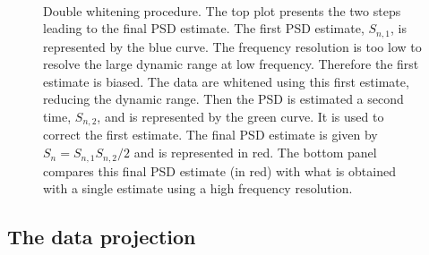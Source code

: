 \begin{figure}
  \center
   \\
  \caption{Double whitening procedure. The top plot presents the two steps leading to the final PSD estimate. The first PSD estimate, $S_{n,1}$, is represented by the blue curve. The frequency resolution is too low to resolve the large dynamic range at low frequency. Therefore the first estimate is biased. The data are whitened using this first estimate, reducing the dynamic range. Then the PSD is estimated a second time, $S_{n,2}$, and is represented by the green curve. It is used to correct the first estimate. The final PSD estimate is given by $S_n=S_{n,1}S_{n,2}/2$ and is represented in red. The bottom panel compares this final PSD estimate (in red) with what is obtained with a single estimate using a high frequency resolution.}
  \label{fig:doublewhite}
\end{figure}



\subsection{The data projection} \label{sec:algorithm:projection}

